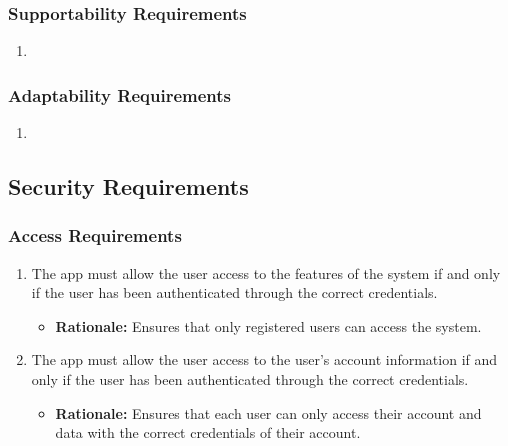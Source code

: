 \documentclass[]{article}
\begin{document}
\subsubsection{Supportability Requirements}
\label{ssub:supportability_requirements}
\begin{enumerate}[{MS-S}1. ]
	\item 
\end{enumerate}

\subsubsection{Adaptability Requirements}
\label{ssub:adaptability_requirements}
\begin{enumerate}[{MS-A}1. ]
	\item 
\end{enumerate}


\subsection{Security Requirements}
\label{sub:security_requirements}

\subsubsection{Access Requirements}
\label{ssub:access_requirements}
\begin{enumerate}[{SR-AC}1. ]
\item The app must allow the user access to the features of the system if and only if the user has been authenticated through the correct credentials.
    \begin{itemize}
        \item \textbf{Rationale:} Ensures that only registered users can access the system.
    \end{itemize}

\item The app must allow the user access to the user's account information if and only if the user has been authenticated through the correct credentials.
    \begin{itemize}
        \item \textbf{Rationale:} Ensures that each user can only access their account and data with the correct credentials of their account.
    \end{itemize}
\end{enumerate}
\end{document}
